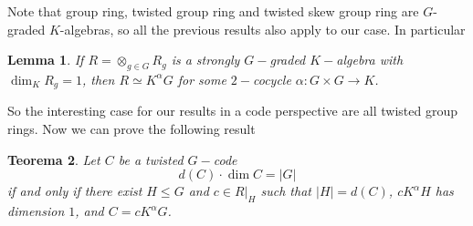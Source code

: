 \documentclass{article}
\newtheorem{theorem}{Teorema}
\newtheorem{lemma}[theorem]{Lemma}
\begin{document}
Note that group ring, twisted group ring and twisted skew group ring  are $G$-graded $K$-algebras, so all the previous results also apply to our case. In particular

\begin{lemma}
    If $R=\otimes_{g\in G} R_g$ is a strongly $G-$graded $K-$algebra with $\dim_K R_g =1$, then $R\simeq K^\alpha G$ for some  $2-$cocycle $\alpha :G\times G \longrightarrow K$.
\end{lemma}
So the interesting case for our results in a code perspective are all twisted group rings. Now we can prove the following result

\begin{theorem}
Let $C$ be a twisted $G-$code
\[
d(C)\cdot \dim C = |G|
\]
if and only if there exist $H \le G$ and $c \in R|_H$ such that
$|H| = d(C)$, $c K^\alpha H$ has dimension $1$, and $C = c K^\alpha G$.
\end{theorem}
\end{document}
